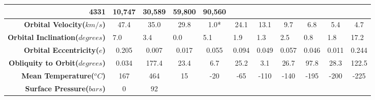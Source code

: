 \begin{landscape}
\begin{table}[H]
\begin{tabular}{|r|c|c|c|c|c|c|c|c|c|c|}
  \cellcolor[HTML]{FFFFFF}4331 &
  \cellcolor[HTML]{F5F5F5}10,747 &
  \cellcolor[HTML]{FFFFFF}30,589 &
  \cellcolor[HTML]{F5F5F5}59,800 &
  \cellcolor[HTML]{FFFFFF}90,560 \\ \hline
\textbf{Orbital Velocity($km/s$)} &
  \cellcolor[HTML]{F5F5F5}47.4 &
  \cellcolor[HTML]{FFFFFF}35.0 &
  \cellcolor[HTML]{F5F5F5}29.8 &
  \cellcolor[HTML]{FFFFFF}1.0* &
  \cellcolor[HTML]{F5F5F5}24.1 &
  \cellcolor[HTML]{FFFFFF}13.1 &
  \cellcolor[HTML]{F5F5F5}9.7 &
  \cellcolor[HTML]{FFFFFF}6.8 &
  \cellcolor[HTML]{F5F5F5}5.4 &
  \cellcolor[HTML]{FFFFFF}4.7 \\ \hline
\textbf{Orbital Inclination($degrees$)} &
  \multicolumn{1}{l|}{\cellcolor[HTML]{F5F5F5}7.0} &
  \multicolumn{1}{l|}{\cellcolor[HTML]{FFFFFF}3.4} &
  \multicolumn{1}{l|}{\cellcolor[HTML]{F5F5F5}0.0} &
  \multicolumn{1}{l|}{\cellcolor[HTML]{FFFFFF}5.1} &
  \multicolumn{1}{l|}{\cellcolor[HTML]{F5F5F5}1.9} &
  \multicolumn{1}{l|}{\cellcolor[HTML]{FFFFFF}1.3} &
  \multicolumn{1}{l|}{\cellcolor[HTML]{F5F5F5}2.5} &
  \multicolumn{1}{l|}{\cellcolor[HTML]{FFFFFF}0.8} &
  \multicolumn{1}{l|}{\cellcolor[HTML]{F5F5F5}1.8} &
  \multicolumn{1}{l|}{\cellcolor[HTML]{FFFFFF}17.2} \\ \hline
\textbf{Orbital Eccentricity($e$)} &
  \cellcolor[HTML]{F5F5F5}0.205 &
  \cellcolor[HTML]{FFFFFF}0.007 &
  \cellcolor[HTML]{F5F5F5}0.017 &
  \cellcolor[HTML]{FFFFFF}0.055 &
  \cellcolor[HTML]{F5F5F5}0.094 &
  \cellcolor[HTML]{FFFFFF}0.049 &
  \cellcolor[HTML]{F5F5F5}0.057 &
  \cellcolor[HTML]{FFFFFF}0.046 &
  \cellcolor[HTML]{F5F5F5}0.011 &
  \cellcolor[HTML]{FFFFFF}0.244 \\ \hline
\textbf{Obliquity to Orbit($degrees$)} &
  \cellcolor[HTML]{F5F5F5}0.034 &
  \cellcolor[HTML]{FFFFFF}177.4 &
  \cellcolor[HTML]{F5F5F5}23.4 &
  \cellcolor[HTML]{FFFFFF}6.7 &
  \cellcolor[HTML]{F5F5F5}25.2 &
  \cellcolor[HTML]{FFFFFF}3.1 &
  \cellcolor[HTML]{F5F5F5}26.7 &
  \cellcolor[HTML]{FFFFFF}97.8 &
  \cellcolor[HTML]{F5F5F5}28.3 &
  \cellcolor[HTML]{FFFFFF}122.5 \\ \hline
\textbf{Mean Temperature($^oC$)} &
  \cellcolor[HTML]{F5F5F5}167 &
  \cellcolor[HTML]{FFFFFF}464 &
  \cellcolor[HTML]{F5F5F5}15 &
  \cellcolor[HTML]{FFFFFF}-20 &
  \cellcolor[HTML]{F5F5F5}-65 &
  \cellcolor[HTML]{FFFFFF}-110 &
  \cellcolor[HTML]{F5F5F5}-140 &
  \cellcolor[HTML]{FFFFFF}-195 &
  \cellcolor[HTML]{F5F5F5}-200 &
  \cellcolor[HTML]{FFFFFF}-225 \\ \hline
\textbf{Surface Pressure($bars$)} &
  \cellcolor[HTML]{F5F5F5}0 &
  \cellcolor[HTML]{FFFFFF}92 &

\end{tabular}
\end{table}
\end{landscape}

